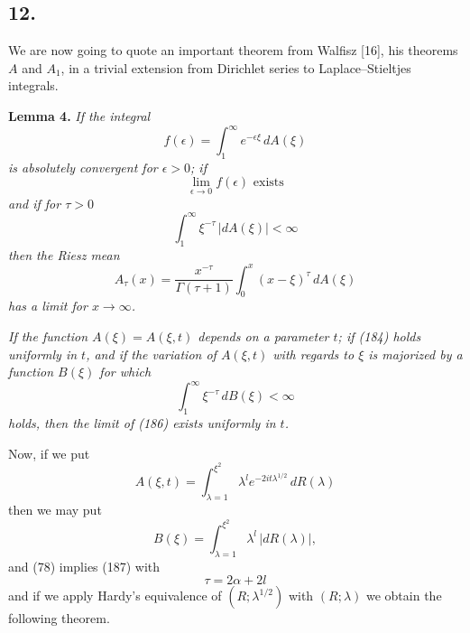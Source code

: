 \documentclass[12pt]{article}
\begin{document}
\subsection*{12.}

We are now going to quote an important theorem from Walfisz [16], his theorems \(A\) and \(A_1\), in a trivial extension from Dirichlet series to Laplace–Stieltjes integrals.

\medskip

\noindent\textbf{Lemma 4.} \emph{If the integral}
\begin{equation}
f(\epsilon) = \int_1^{\infty} e^{-\epsilon\xi} \, dA(\xi)
\tag{183}
\end{equation}
\emph{is absolutely convergent for \(\epsilon > 0\); if}
\begin{equation}
\lim_{\epsilon \to 0} f(\epsilon) \text{ exists}
\tag{184}
\end{equation}
\emph{and if for \(\tau > 0\)}
\begin{equation}
\int_1^{\infty} \xi^{-\tau} \, |dA(\xi)| < \infty
\tag{185}
\end{equation}
\emph{then the Riesz mean}
\begin{equation}
A_\tau(x) = \frac{x^{-\tau}}{\Gamma(\tau + 1)} \int_0^x (x - \xi)^\tau \, dA(\xi)
\tag{186}
\end{equation}
\emph{has a limit for \(x \to \infty\).}

\emph{If the function \(A(\xi) = A(\xi, t)\) depends on a parameter \(t\); if (184) holds uniformly in \(t\), and if the variation of \(A(\xi, t)\) with regards to \(\xi\) is majorized by a function \(B(\xi)\) for which}
\begin{equation}
\int_1^{\infty} \xi^{-\tau} \, dB(\xi) < \infty
\tag{187}
\end{equation}
\emph{holds, then the limit of (186) exists uniformly in \(t\).}

Now, if we put
\begin{equation}
A(\xi, t) = \int_{\lambda=1}^{\xi^2} \lambda^l e^{-2it\lambda^{1/2}} \, dR(\lambda)
\tag{188}
\end{equation}
then we may put
\[
B(\xi) = \int_{\lambda=1}^{\xi^2} \lambda^l \, |dR(\lambda)|,
\]
and (78) implies (187) with
\begin{equation}
\tau = 2\alpha + 2l
\tag{189}
\end{equation}
and if we apply Hardy's equivalence of \((R; \lambda^{1/2})\) with \((R; \lambda)\) we obtain the following theorem.

\medskip
\end{document}
